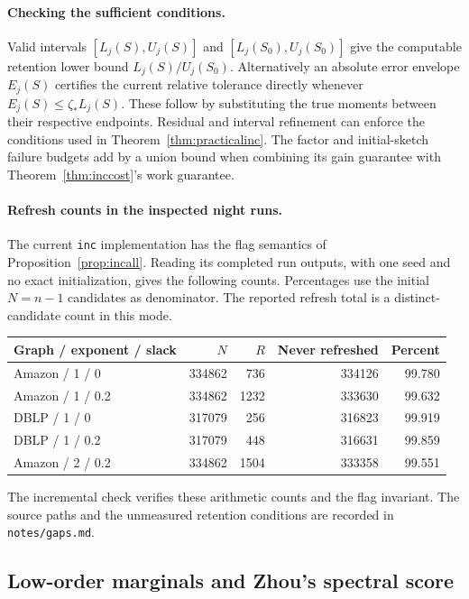 \documentclass[11pt]{article}
\begin{document}
\paragraph{Checking the sufficient conditions.}
Valid intervals $[L_j(S),U_j(S)]$ and $[L_j(S_0),U_j(S_0)]$
give the computable retention lower bound $L_j(S)/U_j(S_0)$.
Alternatively an absolute error envelope $E_j(S)$ certifies the
current relative tolerance directly whenever
$E_j(S)\leq\zeta_*L_j(S)$. These follow by substituting the
true moments between their respective endpoints. Residual and
interval refinement can enforce the conditions used in
Theorem~\ref{thm:practicalinc}. The factor and initial-sketch
failure budgets add by a union bound when combining its gain
guarantee with Theorem~\ref{thm:inccost}'s work guarantee.

\paragraph{Refresh counts in the inspected night runs.}
The current \texttt{inc} implementation has the flag semantics of
Proposition~\ref{prop:incall}. Reading its completed run outputs,
with one seed and no exact initialization, gives the following
counts. Percentages use the initial $N=n-1$ candidates as denominator.
The reported refresh total is a distinct-candidate count in this mode.
\begin{center}
\begin{tabular}{lrrrr}
Graph / exponent / slack & $N$ & $R$ & Never refreshed & Percent\\\hline
Amazon / 1 / 0 &334862&736&334126&99.780\\
Amazon / 1 / 0.2 &334862&1232&333630&99.632\\
DBLP / 1 / 0 &317079&256&316823&99.919\\
DBLP / 1 / 0.2 &317079&448&316631&99.859\\
Amazon / 2 / 0.2 &334862&1504&333358&99.551
\end{tabular}
\end{center}
The incremental check verifies these arithmetic counts and the flag
invariant. The source paths and the unmeasured retention conditions
are recorded in \texttt{notes/gaps.md}.

\subsection{Low-order marginals and Zhou's spectral score}
\end{document}
